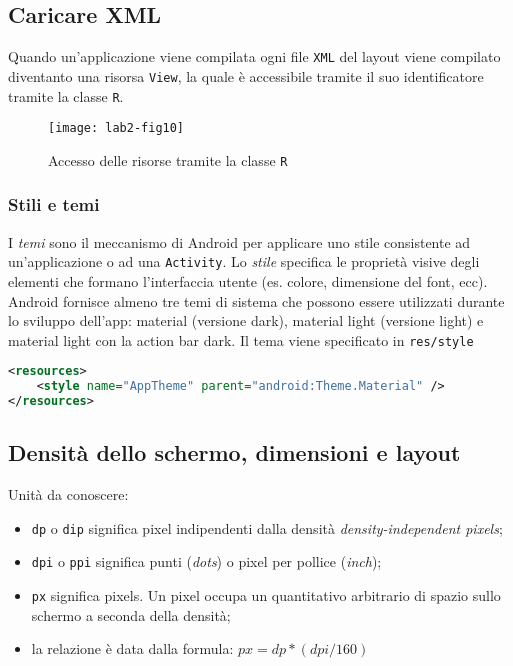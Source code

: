 \subsection{Caricare XML}

Quando un'applicazione viene compilata ogni file \texttt{XML} del layout viene
compilato diventanto una risorsa \texttt{View}, la quale è accessibile tramite
il suo identificatore tramite la classe \texttt{R}.

\begin{figure*}[htbp]
        \centering
        \texttt{[image: lab2-fig10]}
        \caption[Accesso risorse R]{Accesso delle risorse tramite la classe
\texttt{R}}
        \label{img:lab2-fig10}
\end{figure*}

\subsubsection{Stili e temi}

I \textit{temi} sono il meccanismo di Android per applicare uno stile
consistente ad un'applicazione o ad una \texttt{Activity}. Lo \textit{stile}
specifica le proprietà visive degli elementi che formano l'interfaccia utente
(es. colore, dimensione del font, ecc).
Android fornisce almeno tre temi di sistema che possono essere utilizzati
durante lo sviluppo dell'app: material (versione dark), material light (versione
light) e material light con la action bar dark. Il tema viene specificato in
\texttt{res/style}

\begin{lstlisting}[language=XML]
<resources>
    <style name="AppTheme" parent="android:Theme.Material" />
</resources>
\end{lstlisting}

\subsection{Densità dello schermo, dimensioni e layout}

Unità da conoscere:
\begin{itemize}
\item \texttt{dp} o \texttt{dip} significa pixel indipendenti dalla densità
\textit{density-independent pixels};
\item \texttt{dpi} o \texttt{ppi} significa punti (\textit{dots}) o pixel per
pollice (\textit{inch});
\item \texttt{px} significa pixels. Un pixel occupa un quantitativo arbitrario di spazio
sullo schermo a seconda della densità;
\item la relazione è data dalla formula: $px = dp * (dpi/160)$
\end{itemize}

